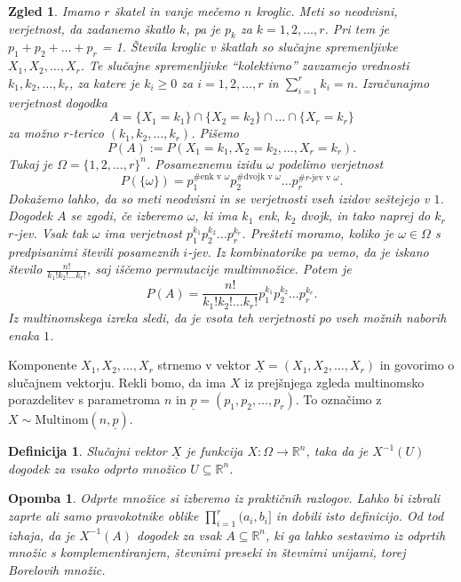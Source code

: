 \documentclass[10pt, a4paper]{article}
\newtheorem{defi}[izr]{Definicija}
\newenvironment{noticeB}{%
  \tcolorbox[%
  notitle,
  empty,
  enhanced,  %
  breakable,
  coltext=black,
  colback=white, 
  fontupper=\rmfamily,
  noparskip,
  sharp corners,
  boxrule=-1pt,  %
  frame hidden,
  left=7pt,  %
  right=7pt,
  top=5pt,
  bottom=5pt,
  before skip=2.5ex plus 2pt,
  after skip=2.5ex plus 2pt,
  borderline west = {1.5pt}{-0.1pt}{blue!30!black}, %
  overlay unbroken and last={%
    \draw[color=black, line width=1.25pt]
    ($(frame.south west)+(1.pt, -0.1pt)$) -- ++(2em, 0);
  }
  ]}
{\endtcolorbox}
\newenvironment{definicija}{\begin{noticeB}\begin{defi}}{%
    \end{defi}\end{noticeB}}
\newtheorem*{opomba}{Opomba}
\newtheorem{zgled}[izr]{Zgled}
\newcommand{\R}{\mathbb {R}}
\begin{document}
\begin{zgled}
  Imamo $r$ škatel in vanje mečemo $n$ kroglic.
  Meti so neodvisni, verjetnost, da zadanemo škatlo $k$,
  pa je $p_k$ za $k = 1, 2, \dots, r$.
  Pri tem je $p_1 + p_2 + \dots + p_r$ = 1.
  Števila kroglic v škatlah so slučajne spremenljivke $X_1, X_2, \dots, X_r$.
  Te slučajne spremenljivke "`kolektivno"' zavzamejo vrednosti $k_1, k_2, \dots, k_r$,
  za katere je $k_i \geq 0$ za $i = 1, 2, \dots, r$ in $\sum_{i = 1}^r k_i = n.$
  Izračunajmo verjetnost dogodka 
  $$A = \{X_1 = k_1\} \cap \{X_2 = k_2\} \cap \dots \cap \{X_r = k_r\}$$
  za možno $r$-terico $(k_1, k_2, \dots, k_r)$.
  Pišemo 
  $$P(A) := P(X_1 = k_1, X_2 = k_2, \dots, X_r = k_r).$$
  Tukaj je $\Omega = \{1, 2, \dots, r\}^n$.
  Posameznemu izidu $\omega$ podelimo verjetnost
  $$P(\{\omega\}) = p_1^{\text{\# enk v $\omega$}} p_2^{\text{\# dvojk v $\omega$}} \dots p_r^{\text{\# $r$-jev v $\omega$}}.$$
  Dokažemo lahko, da so meti neodvisni in se verjetnosti vseh izidov seštejejo v $1$.
  Dogodek $A$ se zgodi, če izberemo $\omega$, ki ima 
  $k_1$ enk, $k_2$ dvojk, in tako naprej do $k_r$ $r$-jev.
  Vsak tak $\omega$ ima verjetnost $p_1^{k_1} p_2^{k_2} \dots p_r^{k_r}$.
  Prešteti moramo, koliko je $\omega \in \Omega$ s predpisanimi števili posameznih $i$-jev.
  Iz kombinatorike pa vemo, da je iskano število
  $\frac{n!}{k_1! k_2! \dots k_r!}$, saj iščemo permutacije multimnožice.
  Potem je $$P(A) = \frac{n!}{k_1! k_2! \dots k_r!} p_1^{k_1} p_2^{k_2} \dots p_r^{k_r}.$$
  Iz multinomskega izreka sledi, da je vsota teh verjetnosti po vseh možnih naborih enaka $1$. 
\end{zgled}

Komponente $X_1, X_2, \dots, X_r$ strnemo v vektor $\underline{X} = (X_1, X_2, \dots, X_r)$
in govorimo o slučajnem vektorju.
Rekli bomo, da ima $X$ iz prejšnjega zgleda multinomsko porazdelitev s parametroma $n$ in $\underline{p} = (p_1, p_2, \dots, p_r)$.
To označimo z $X \sim \mathrm{Multinom} (n, \underline{p})$.

\begin{definicija}
  Slučajni vektor $\underline{X}$ je funkcija $X: \Omega \to \R^n$,
  taka da je $X^{-1} (U)$ dogodek za vsako odprto množico $U\subseteq \R^n$.
\end{definicija}

\begin{opomba}
  Odprte množice si izberemo iz praktičnih razlogov.
  Lahko bi izbrali zaprte ali samo pravokotnike oblike $\prod_{i = 1} ^r (a_i, b_i]$
  in dobili isto definicijo. Od tod izhaja, da je $X^{-1} (A)$ dogodek za vsak $A \subseteq \R^n$,
  ki ga lahko sestavimo iz odprtih množic s komplementiranjem, števnimi preseki in števnimi unijami,
  torej Borelovih množic.
\end{opomba}
\end{document}
